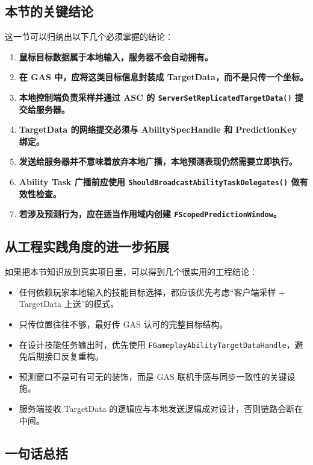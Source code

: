 \documentclass[10pt,CJKmath]{ctexart}
\begin{document}
\subsection{本节的关键结论}

这一节可以归纳出以下几个必须掌握的结论：

\begin{enumerate}
	\item \textbf{鼠标目标数据属于本地输入，服务器不会自动拥有。}
	\item \textbf{在 GAS 中，应将这类目标信息封装成 TargetData，而不是只传一个坐标。}
	\item \textbf{本地控制端负责采样并通过 ASC 的 \texttt{ServerSetReplicatedTargetData()} 提交给服务器。}
	\item \textbf{TargetData 的网络提交必须与 AbilitySpecHandle 和 PredictionKey 绑定。}
	\item \textbf{发送给服务器并不意味着放弃本地广播，本地预测表现仍然需要立即执行。}
	\item \textbf{Ability Task 广播前应使用 \texttt{ShouldBroadcastAbilityTaskDelegates()} 做有效性检查。}
	\item \textbf{若涉及预测行为，应在适当作用域内创建 \texttt{FScopedPredictionWindow}。}
\end{enumerate}

\subsection{从工程实践角度的进一步拓展}

如果把本节知识放到真实项目里，可以得到几个很实用的工程结论：

\begin{itemize}
	\item 任何依赖玩家本地输入的技能目标选择，都应该优先考虑“客户端采样 + TargetData 上送”的模式。
	\item 只传位置往往不够，最好传 GAS 认可的完整目标结构。
	\item 在设计技能任务输出时，优先使用 \texttt{FGameplayAbilityTargetDataHandle}，避免后期接口反复重构。
	\item 预测窗口不是可有可无的装饰，而是 GAS 联机手感与同步一致性的关键设施。
	\item 服务端接收 TargetData 的逻辑应与本地发送逻辑成对设计，否则链路会断在中间。
\end{itemize}

\subsection{一句话总括}
\end{document}
